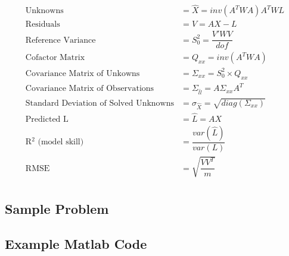 \begin{align*}
	\text{Unknowns} &= \hat{X} = inv(A^TWA)A^TWL\\
	\text{Residuals} &= V = AX - L\\
	\text{Reference Variance} &= S_0^2 = \dfrac{V'WV}{dof} \\
	\text{Cofactor Matrix} &= Q_{xx} = inv(A^TWA) \\
	\text{Covariance Matrix of Unkowns} &= \Sigma_{xx} = S_0^2 \times Q_{xx} \\
	\text{Covariance Matrix of Observations} &= \Sigma_{\hat{l}\hat{l}} = A \Sigma_{xx} A^T \\
	\text{Standard Deviation of Solved Unknowns} &= \sigma_{\hat{X}} = \sqrt{diag(\Sigma_{xx})} \\
	\text{Predicted L} &= \hat{L} = AX \\
	\text{R$^2$ (model skill)} &= \dfrac{var(\hat{L})}{var(L)} \\
	\text{RMSE } &= \sqrt{\dfrac{VV^T}{m}} \\
\end{align*}
\clearpage
\subsection{Sample Problem}
\subsection{Example Matlab Code}


